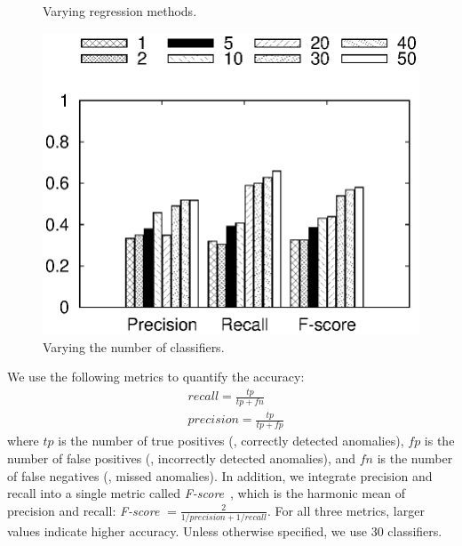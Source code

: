 \begin{figure}[ht]
\begin{minipage}{\figurewidthE}
        \caption{Varying regression methods.}
        \label{fig:regression}
    \end{minipage}
    \begin{minipage}{\figurewidthE}%
        \centering
        \includegraphics[width=\figurewidthE]{Figs/multi-num-classifier.eps}
        \caption{Varying the number of classifiers.}
        \label{fig:multi-num-classifier}
    \end{minipage}
\end{figure}


We use the following metrics to quantify the accuracy:
\begin{align}
&recall = \frac{tp}{tp+fn}\\
&precision = \frac{tp}{tp+fp}
\label{eqn:metric}
\end{align}
where $tp$ is the number of true positives (\ie, correctly detected anomalies),
$fp$ is the number of false positives (\ie, incorrectly detected anomalies),
and $fn$ is the number of false negatives (\ie, missed anomalies).
In addition, we integrate precision and recall into a single metric
called {\em F-score}~\cite{wiki:F-score}, which is the harmonic mean
of precision and recall: {\em F-score} $ = \frac{2}{1/precision +               
1/recall}$. For all three metrics, larger values indicate higher accuracy.
Unless otherwise specified, we use 30 classifiers.

